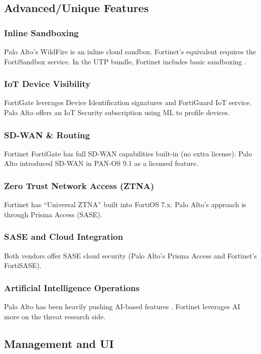 \documentclass[12pt]{article}
\begin{document}
\subsection{Advanced/Unique Features}

\subsubsection{Inline Sandboxing}
Palo Alto's WildFire is an inline cloud sandbox. Fortinet's equivalent requires the FortiSandbox service. In the UTP bundle, Fortinet includes basic sandboxing \cite{fortinetbundles2024}.

\subsubsection{IoT Device Visibility}
FortiGate leverages Device Identification signatures and FortiGuard IoT service. Palo Alto offers an IoT Security subscription using ML to profile devices.

\subsubsection{SD-WAN \& Routing}
Fortinet FortiGate has full SD-WAN capabilities built-in (no extra license). Palo Alto introduced SD-WAN in PAN-OS 9.1 as a licensed feature.

\subsubsection{Zero Trust Network Access (ZTNA)}
Fortinet has ``Universal ZTNA'' built into FortiOS 7.x. Palo Alto's approach is through Prisma Access (SASE).

\subsubsection{SASE and Cloud Integration}
Both vendors offer SASE cloud security (Palo Alto's Prisma Access and Fortinet's FortiSASE).

\subsubsection{Artificial Intelligence Operations}
Palo Alto has been heavily pushing AI-based features \cite{paloaltoatp2024}. Fortinet leverages AI more on the threat research side.

\subsection{Management and UI}
\end{document}
